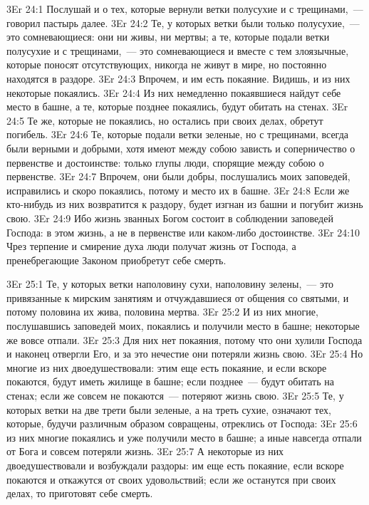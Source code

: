 \vs 3Er 24:1
Послушай и о тех, которые
вернули ветки полусухие и с трещинами,~--- говорил пастырь далее.
\vs 3Er 24:2
Те, у которых ветки были
только полусухие,~--- это сомневающиеся: они ни живы, ни мертвы; а те, которые
подали ветки полусухие и с трещинами,~--- это сомневающиеся и вместе с тем
злоязычные, которые поносят отсутствующих, никогда не живут в мире, но
постоянно находятся в раздоре.
\vs 3Er 24:3
Впрочем, и им есть
покаяние. Видишь, и из них некоторые покаялись.
\vs 3Er 24:4
Из них немедленно
покаявшиеся найдут себе место в башне, а те, которые позднее покаялись, будут
обитать на стенах.
\vs 3Er 24:5
Те же, которые не
покаялись, но остались при своих делах, обретут погибель.
\vs 3Er 24:6
Те, которые подали ветки
зеленые, но с трещинами, всегда были верными и добрыми, хотя имеют между собою
зависть и соперничество о первенстве и достоинстве: только глупы люди,
спорящие между собою о первенстве.
\vs 3Er 24:7
Впрочем, они были добры,
послушались моих заповедей, исправились и скоро покаялись, потому и место их в
башне.
\vs 3Er 24:8
Если же кто-нибудь из них
возвратится к раздору, будет изгнан из башни и погубит жизнь свою.
\vs 3Er 24:9
Ибо жизнь званных Богом
состоит в соблюдении заповедей Господа: в этом жизнь, а не в первенстве или
каком-либо достоинстве.
\vs 3Er 24:10
Чрез терпение и смирение
духа люди получат жизнь от Господа, а пренебрегающие Законом приобретут себе
смерть.

\vs 3Er 25:1
Те, у которых ветки
наполовину сухи, наполовину зелены,~--- это привязанные к мирским занятиям и
отчуждавшиеся от общения со святыми, и потому половина их жива, половина
мертва.
\vs 3Er 25:2
И из них многие,
послушавшись заповедей моих, покаялись и получили место в башне; некоторые же
вовсе отпали.
\vs 3Er 25:3
Для них нет покаяния,
потому что они хулили Господа и наконец отвергли Его, и за это нечестие они
потеряли жизнь свою.
\vs 3Er 25:4
Но многие из них
двоедушествовали: этим еще есть покаяние, и если вскоре покаются, будут иметь
жилище в башне; если позднее~--- будут обитать на стенах; если же совсем не
покаются~--- потеряют жизнь свою.
\vs 3Er 25:5
Те, у которых ветки на две
трети были зеленые, а на треть сухие, означают тех, которые, будучи различным
образом совращены, отреклись от Господа:
\vs 3Er 25:6
из них многие покаялись и
уже получили место в башне; а иные навсегда отпали от Бога и совсем потеряли
жизнь.
\vs 3Er 25:7
А некоторые из них
двоедушествовали и возбуждали раздоры: им еще есть покаяние, если вскоре
покаются и откажутся от своих удовольствий; если же останутся при своих делах,
то приготовят себе смерть.

